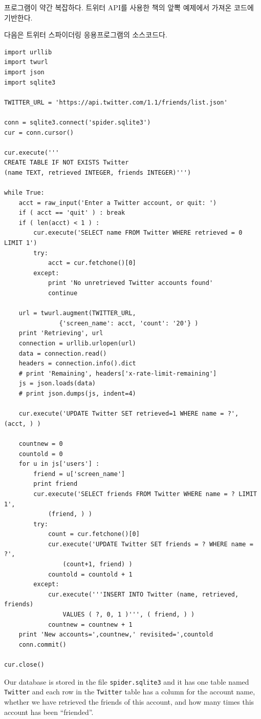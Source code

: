 프로그램이 약간 복잡하다. 트위터 API를 사용한 책의 앞뽁 예제에서 가져온 코드에 기반한다.

다음은 트위터 스파이더링 응용프로그램의 소스코드다.

\beforeverb
\begin{verbatim}
import urllib
import twurl
import json
import sqlite3

TWITTER_URL = 'https://api.twitter.com/1.1/friends/list.json'

conn = sqlite3.connect('spider.sqlite3')
cur = conn.cursor()

cur.execute('''
CREATE TABLE IF NOT EXISTS Twitter 
(name TEXT, retrieved INTEGER, friends INTEGER)''')

while True:
    acct = raw_input('Enter a Twitter account, or quit: ')
    if ( acct == 'quit' ) : break
    if ( len(acct) < 1 ) :
        cur.execute('SELECT name FROM Twitter WHERE retrieved = 0 LIMIT 1')
        try:
            acct = cur.fetchone()[0]
        except:
            print 'No unretrieved Twitter accounts found'
            continue

    url = twurl.augment(TWITTER_URL, 
               {'screen_name': acct, 'count': '20'} )
    print 'Retrieving', url
    connection = urllib.urlopen(url)
    data = connection.read()
    headers = connection.info().dict
    # print 'Remaining', headers['x-rate-limit-remaining']
    js = json.loads(data)
    # print json.dumps(js, indent=4)

    cur.execute('UPDATE Twitter SET retrieved=1 WHERE name = ?', (acct, ) )

    countnew = 0
    countold = 0
    for u in js['users'] :
        friend = u['screen_name']
        print friend
        cur.execute('SELECT friends FROM Twitter WHERE name = ? LIMIT 1', 
            (friend, ) )
        try:
            count = cur.fetchone()[0]
            cur.execute('UPDATE Twitter SET friends = ? WHERE name = ?', 
                (count+1, friend) )
            countold = countold + 1
        except:
            cur.execute('''INSERT INTO Twitter (name, retrieved, friends) 
                VALUES ( ?, 0, 1 )''', ( friend, ) )
            countnew = countnew + 1
    print 'New accounts=',countnew,' revisited=',countold
    conn.commit()

cur.close()
\end{verbatim}
\afterverb
%



Our database is stored in the file {\tt spider.sqlite3} and it has one 
table named {\tt Twitter} and each row in the {\tt Twitter} table
has a column for the account name, whether we have retrieved the friends
of this account, and how many times this account has been ``friended''.

